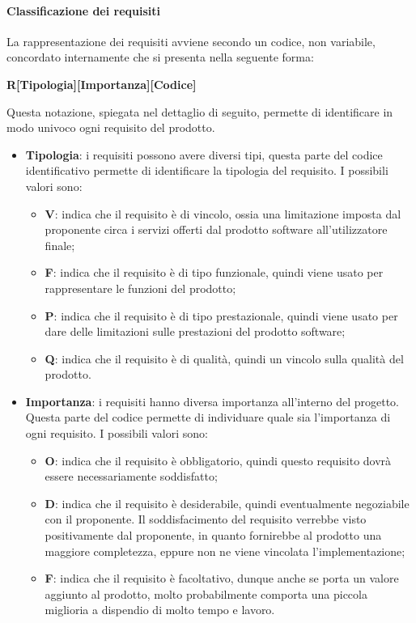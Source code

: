 \paragraph{Classificazione dei requisiti}
La rappresentazione dei requisiti avviene secondo un codice, non variabile, concordato internamente che si presenta nella seguente forma:

\begin{center}
    \textbf{R[Tipologia][Importanza][Codice]}
\end{center}

Questa notazione, spiegata nel dettaglio di seguito, permette di identificare in modo univoco ogni requisito del prodotto.\\
\begin{itemize}
    \item \textbf{Tipologia}: i requisiti possono avere diversi tipi, questa parte del codice identificativo permette di 
    identificare la tipologia del requisito. I possibili valori sono:
    \begin{itemize}
        \item \textbf{V}: indica che il requisito è di vincolo, ossia una limitazione imposta dal 
        proponente circa i servizi offerti dal prodotto software all'utilizzatore finale;
        \item \textbf{F}: indica che il requisito è di tipo funzionale, quindi viene usato per 
        rappresentare le funzioni del prodotto;
        \item \textbf{P}: indica che il requisito è di tipo prestazionale, quindi viene usato per dare 
        delle limitazioni sulle prestazioni del prodotto software;
        \item \textbf{Q}: indica che il requisito è di qualità, quindi un vincolo sulla qualità del prodotto.
    \end{itemize}
    \item \textbf{Importanza}: i requisiti hanno diversa importanza all'interno del progetto. Questa parte del codice 
    permette di individuare quale sia l'importanza di ogni requisito. I possibili valori sono:
    \begin{itemize}
        \item \textbf{O}: indica che il requisito è obbligatorio, quindi questo requisito dovrà essere necessariamente 
        soddisfatto;
        \item \textbf{D}: indica che il requisito è desiderabile, quindi eventualmente negoziabile con il proponente. 
        Il soddisfacimento del requisito verrebbe visto positivamente dal proponente, in quanto fornirebbe al prodotto 
        una maggiore completezza, eppure non ne viene vincolata l'implementazione;
        \item \textbf{F}: indica che il requisito è facoltativo, dunque anche se porta un valore aggiunto al prodotto, 
        molto probabilmente comporta una piccola miglioria a dispendio di molto tempo e lavoro.
    \end{itemize}
    

\end{itemize}
